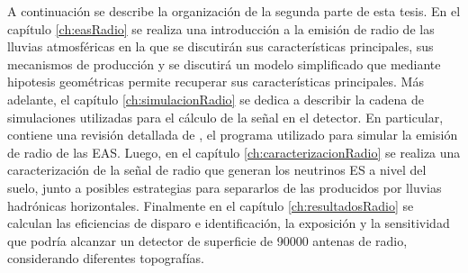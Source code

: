 A continuaci\'on se describe la organizaci\'on de la segunda parte de esta tesis.
En el capítulo \ref{ch:easRadio} se realiza una introducción a la emisión de radio de las lluvias atmosféricas en la que se discutirán sus características principales, sus mecanismos de producción y se discutirá un modelo simplificado que mediante hipotesis geom\'etricas permite recuperar sus características principales.
Más adelante, el capítulo \ref{ch:simulacionRadio} se dedica a describir la cadena de simulaciones utilizadas para el c\'alculo de la se\~nal en el detector. 
En particular, contiene una revisión detallada de \zhs{}, el programa utilizado para simular la emisión de radio de las EAS.
Luego, en el cap\'itulo \ref{ch:caracterizacionRadio} se realiza una caracterización de la señal de radio que generan los neutrinos ES  a nivel del suelo, junto a posibles estrategias para separarlos de las producidos por lluvias hadr\'onicas horizontales.
Finalmente en el capítulo \ref{ch:resultadosRadio} se calculan las eficiencias de disparo e identificaci\'on, la exposición y la sensitividad que podría alcanzar un detector de superficie de 90000 antenas de radio, considerando diferentes topografías.


